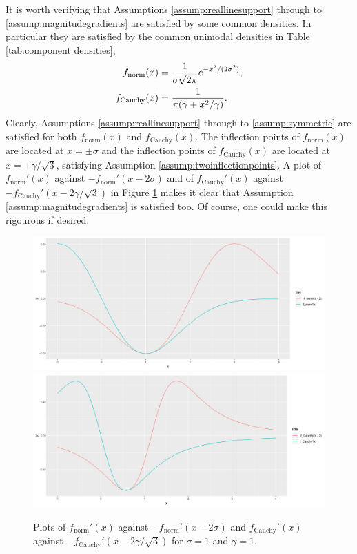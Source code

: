 		
		It is worth verifying that Assumptions \ref{assump:reallinesupport} through to \ref{assump:magnitudegradients} are satisfied by some common densities. In particular they are satisfied by the common unimodal densities in Table \ref{tab:component densities},
		\begin{align}
			f_\mathrm{norm}(x) &= \frac{1}{\sigma\sqrt{2\pi}} e^{-x^2/(2\sigma^2)},\\
			f_\mathrm{Cauchy}(x) &= \frac{1}{\pi (\gamma + x^2/\gamma)}.
		\end{align}
		Clearly, Assumptions \ref{assump:reallinesupport} through to \ref{assump:symmetric} are satisfied for both $f_\mathrm{norm}(x)$ and $f_\mathrm{Cauchy}(x)$.
		The inflection points of $f_\mathrm{norm}(x)$ are located at $x = \pm \sigma$ and the inflection points of $f_\mathrm{Cauchy}(x)$ are located at $x = \pm \gamma/\sqrt{3}$, satisfying Assumption \ref{assump:twoinflectionpoints}. A plot of $f_\mathrm{norm}'(x)$ against $-f_\mathrm{norm}'(x - 2\sigma)$ and of $f_\mathrm{Cauchy}'(x)$ against $-f_\mathrm{Cauchy}'(x - 2\gamma/\sqrt{3})$ in Figure \ref{fig:assumption6} makes it clear that Assumption \ref{assump:magnitudegradients} is satisfied too. Of course, one could make this rigourous if desired.

		\begin{figure}
			\centering
			\includegraphics[width = \textwidth]{Figures/Mixtures/assumption6_normal.png}
			\includegraphics[width = \textwidth]{Figures/Mixtures/assumption6_cauchy.png}
			\caption{Plots of $f_\mathrm{norm}'(x)$ against $-f_\mathrm{norm}'(x - 2\sigma)$ and $f_\mathrm{Cauchy}'(x)$ against $-f_\mathrm{Cauchy}'(x - 2\gamma/\sqrt{3})$ for $\sigma = 1$ and $\gamma = 1$.}
			\label{fig:assumption6}
		\end{figure}

